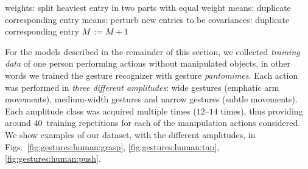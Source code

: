 \begin{algorithm}
  \begin{algorithmic} [1]
   
    \State weights: split heaviest entry in two parts with equal weight
    \State means: duplicate corresponding entry
    \State means: perturb new entries to be
    \State covariances: duplicate corresponding entry
    \State $M \, := M+1$
  \EndWhile
  \EndProcedure
  \end{algorithmic}
\caption[Gaussian mixture splitting.]{Gaussian mixture splitting. $\Mdes$ is the final desired number of Gaussians; pertDepth is a perturbation depth constant (we set it to $0.2$).} \label{algo:upmix}
\end{algorithm}

For the models described in the remainder of this section, we collected \emph{training data} of one person performing actions without manipulated objects, in other words we trained the gesture recognizer with gesture \emph{pantomimes}.
Each action was performed in \emph{three different amplitudes}: wide gestures (emphatic arm movements), medium-width gestures and narrow gestures (subtle movements).
Each amplitude class was acquired multiple times ($12$--$14$ times), thus providing around $40$~training repetitions for each of the manipulation actions considered.
We show examples of our dataset, with the different amplitudes, in Figs.~\ref{fig:gestures:human:grasp}, \ref{fig:gestures:human:tap}, \ref{fig:gestures:human:push}.

\begin{figure*}
  \centering


\caption[Gesture recognition data: example sequence of the \emph{grasp} human gesture.]{Gesture recognition data: example sequence of the \emph{grasp} human gesture. Top: image frames, bottom: depth frames. Amplitude: wide, recording number:~2.}
\label{fig:gestures:human:grasp}
\end{figure*}

